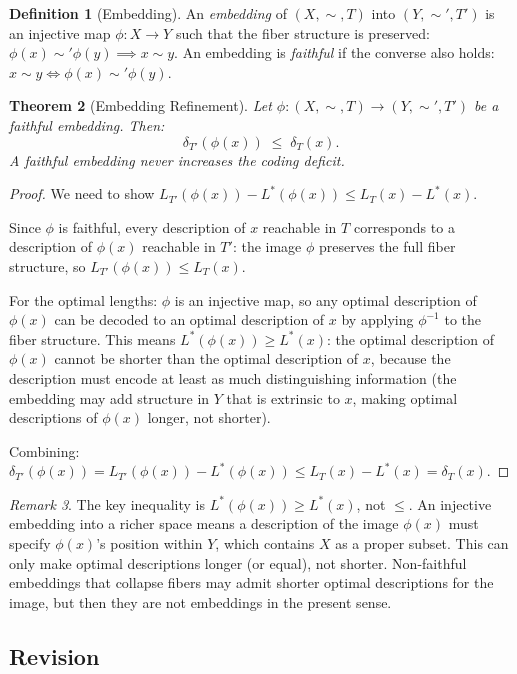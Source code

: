 \documentclass[12pt, a4paper]{article}
\theoremstyle{plain}
\newtheorem{theorem}{Theorem}[section]
\theoremstyle{definition}
\newtheorem{definition}[theorem]{Definition}
\theoremstyle{remark}
\newtheorem{remark}[theorem]{Remark}
\begin{document}
\begin{definition}[Embedding]
An \emph{embedding} of $(X,\sim,T)$ into $(Y,\sim',T')$ is an injective map
$\phi:X\to Y$ such that the fiber structure is preserved:
$\phi(x)\sim'\phi(y)\implies x\sim y$. An embedding is \emph{faithful} if
the converse also holds: $x\sim y\iff\phi(x)\sim'\phi(y)$.
\end{definition}

\begin{theorem}[Embedding Refinement]
\label{thm:embed-refine}
Let $\phi:(X,\sim,T)\to(Y,\sim',T')$ be a faithful embedding. Then:
\[
  \delta_{T'}(\phi(x)) \;\le\; \delta_T(x).
\]
A faithful embedding never increases the coding deficit.
\end{theorem}

\begin{proof}
We need to show $L_{T'}(\phi(x))-L^*(\phi(x))\le L_T(x)-L^*(x)$.

Since $\phi$ is faithful, every description of $x$ reachable in $T$ corresponds
to a description of $\phi(x)$ reachable in $T'$: the image $\phi$ preserves
the full fiber structure, so $L_{T'}(\phi(x))\le L_T(x)$.

For the optimal lengths: $\phi$ is an injective map, so any optimal description
of $\phi(x)$ can be decoded to an optimal description of $x$ by applying
$\phi^{-1}$ to the fiber structure. This means $L^*(\phi(x))\ge L^*(x)$:
the optimal description of $\phi(x)$ cannot be shorter than the optimal
description of $x$, because the description must encode at least as much
distinguishing information (the embedding may add structure in $Y$ that is
extrinsic to $x$, making optimal descriptions of $\phi(x)$ longer, not shorter).

Combining: $\delta_{T'}(\phi(x))=L_{T'}(\phi(x))-L^*(\phi(x))
\le L_T(x)-L^*(x)=\delta_T(x)$.
\end{proof}

\begin{remark}
The key inequality is $L^*(\phi(x))\ge L^*(x)$, not $\le$. An injective
embedding into a richer space means a description of the image $\phi(x)$
must specify $\phi(x)$'s position within $Y$, which contains $X$ as a proper
subset. This can only make optimal descriptions longer (or equal), not shorter.
Non-faithful embeddings that collapse fibers may admit shorter optimal
descriptions for the image, but then they are not embeddings in the present
sense.
\end{remark}

\subsection{Revision}
\end{document}
